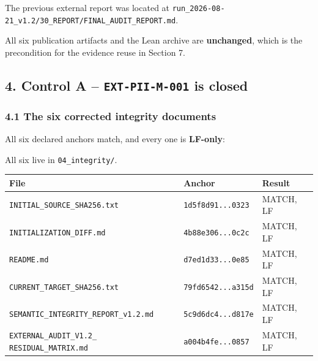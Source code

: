 \documentclass[
  10pt,
]{article}
\newcounter{none} %
\begin{document}
The previous external report was located at
\texttt{run\_2026-08-21\_v1.2/30\_REPORT/FINAL\_AUDIT\_REPORT.md}.

All six publication artifacts and the Lean archive are
\textbf{unchanged}, which is the precondition for the evidence reuse in
Section 7.

\subsection{\texorpdfstring{4. Control A -- \texttt{EXT-PII-M-001} is
closed}{4. Control A -- EXT-PII-M-001 is closed}}\label{control-a-ext-pii-m-001-is-closed}

\subsubsection{4.1 The six corrected integrity
documents}\label{the-six-corrected-integrity-documents}

All six declared anchors match, and every one is \textbf{LF-only}:

All six live in \texttt{04\_integrity/}.

{\def\LTcaptype{none} %
\begin{longtable}[]{@{}
  >{\raggedright\arraybackslash}p{}
  >{\raggedright\arraybackslash}p{}
  >{\raggedright\arraybackslash}p{}@{}}
\toprule\noalign{}
\begin{minipage}[b]{\linewidth}\raggedright
File
\end{minipage} & \begin{minipage}[b]{\linewidth}\raggedright
Anchor
\end{minipage} & \begin{minipage}[b]{\linewidth}\raggedright
Result
\end{minipage} \\
\midrule\noalign{}
\endhead
\bottomrule\noalign{}
\endlastfoot
\texttt{INITIAL\_SOURCE\_SHA256.txt} & \texttt{1d5f8d91...0323} & MATCH,
LF \\
\texttt{INITIALIZATION\_DIFF.md} & \texttt{4b88e306...0c2c} & MATCH,
LF \\
\texttt{README.md} & \texttt{d7ed1d33...0e85} & MATCH, LF \\
\texttt{CURRENT\_TARGET\_SHA256.txt} & \texttt{79fd6542...a315d} &
MATCH, LF \\
\texttt{SEMANTIC\_INTEGRITY\_REPORT\_v1.2.md} &
\texttt{5c9d6dc4...d817e} & MATCH, LF \\
\texttt{EXTERNAL\_AUDIT\_V1.2\_} \texttt{RESIDUAL\_MATRIX.md} &
\texttt{a004b4fe...0857} & MATCH, LF \\
\end{longtable}
}
\end{document}
